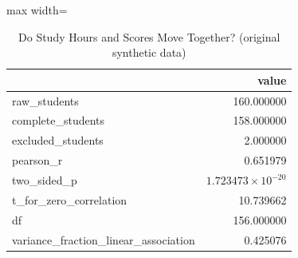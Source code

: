 \begin{table}[htbp]
\centering
\caption{Do Study Hours and Scores Move Together? (original synthetic data)}
\begingroup
\small
\setlength{\tabcolsep}{6pt}
\renewcommand{\arraystretch}{1.12}
\begin{adjustbox}{max width=\linewidth}
\begin{tabular}{@{}lr@{}}
\toprule
 & value \\
\midrule
raw\_students & 160.000000 \\
complete\_students & 158.000000 \\
excluded\_students & 2.000000 \\
pearson\_r & 0.651979 \\
two\_sided\_p & $1.723473 \times 10^{-20}$ \\
t\_for\_zero\_correlation & 10.739662 \\
df & 156.000000 \\
variance\_fraction\_linear\_association & 0.425076 \\
\bottomrule
\end{tabular}
\end{adjustbox}
\endgroup
\end{table}